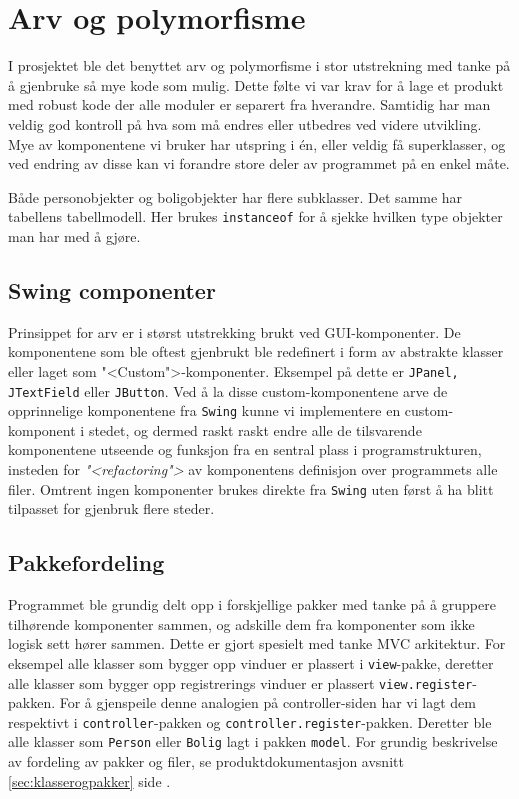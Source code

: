 \section{Arv og polymorfisme}
I prosjektet ble det benyttet arv og polymorfisme i stor utstrekning med tanke på å gjenbruke så mye kode som mulig. Dette følte vi var krav for å lage et produkt med robust kode der alle moduler er separert fra hverandre. Samtidig har man veldig god kontroll på hva som må endres eller utbedres ved videre utvikling. Mye av komponentene vi bruker har utspring i én, eller veldig få superklasser, og ved endring av disse kan vi forandre store deler av programmet på en enkel måte.

Både personobjekter og boligobjekter har flere subklasser. Det samme har tabellens tabellmodell. Her brukes \texttt{instanceof} for å sjekke hvilken type objekter man har med å gjøre.

\subsection{Swing componenter}
Prinsippet for arv er i størst utstrekking brukt ved GUI-komponenter. De komponentene som ble oftest gjenbrukt ble redefinert i form av abstrakte klasser eller laget som "<Custom">-komponenter. Eksempel på dette er \texttt{JPanel, JTextField} eller \texttt{JButton}. Ved å la disse custom-komponentene arve de opprinnelige komponentene fra \texttt{Swing} kunne vi implementere en custom-komponent i stedet, og dermed raskt raskt endre alle de tilsvarende komponentene utseende og funksjon fra en sentral plass i programstrukturen, insteden for \textit{"<refactoring">} av komponentens definisjon over programmets alle filer.
Omtrent ingen komponenter brukes direkte fra \texttt{Swing} uten først å ha blitt tilpasset for gjenbruk flere steder.

\subsection{Pakkefordeling}
Programmet ble grundig delt opp i forskjellige pakker med tanke på å gruppere tilhørende komponenter sammen, og adskille dem fra komponenter som ikke logisk sett hører sammen. Dette er gjort spesielt med tanke MVC arkitektur. For eksempel alle klasser som bygger opp vinduer er plassert i \texttt{view}-pakke, deretter alle klasser som bygger opp registrerings vinduer er plassert \texttt{view.register}-pakken. For å gjenspeile denne analogien på controller-siden har vi lagt dem respektivt i \texttt{controller}-pakken og \texttt{controller.register}-pakken. Deretter ble alle klasser som \texttt{Person} eller \texttt{Bolig} lagt i pakken \texttt{model}. For grundig beskrivelse av fordeling av pakker og filer, se produktdokumentasjon avsnitt \ref{sec:klasserogpakker} side \pageref{sec:klasserogpakker}.


